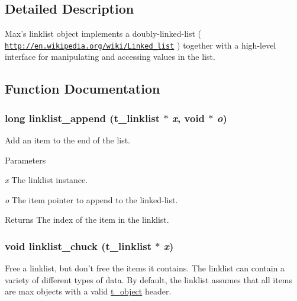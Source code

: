 \subsection{Detailed Description}
Max's linklist object implements a doubly-\/linked-\/list ( \href{http://en.wikipedia.org/wiki/Linked_list}{\tt http://en.wikipedia.org/wiki/Linked\_\-list} ) together with a high-\/level interface for manipulating and accessing values in the list. 

\subsection{Function Documentation}
\hypertarget{group__linklist_ga7360ba45714cb28e2b4cd44aa8998a67}{
\subsubsection[{linklist\_\-append}]{\setlength{\rightskip}{0pt plus 5cm}long linklist\_\-append ({\bf t\_\-linklist} $\ast$ {\em x}, \/  void $\ast$ {\em o})}}
\label{group__linklist_ga7360ba45714cb28e2b4cd44aa8998a67}


Add an item to the end of the list. 
\begin{DoxyParams}{Parameters}
\item[{\em x}]The linklist instance. \item[{\em o}]The item pointer to append to the linked-\/list. \end{DoxyParams}
\begin{DoxyReturn}{Returns}
The index of the item in the linklist. 
\end{DoxyReturn}
\hypertarget{group__linklist_ga033f4bf2a9f806e168697b5ce0f6331e}{
\subsubsection[{linklist\_\-chuck}]{\setlength{\rightskip}{0pt plus 5cm}void linklist\_\-chuck ({\bf t\_\-linklist} $\ast$ {\em x})}}
\label{group__linklist_ga033f4bf2a9f806e168697b5ce0f6331e}


Free a linklist, but don't free the items it contains. The linklist can contain a variety of different types of data. By default, the linklist assumes that all items are max objects with a valid \hyperlink{structt__object}{t\_\-object} header.

